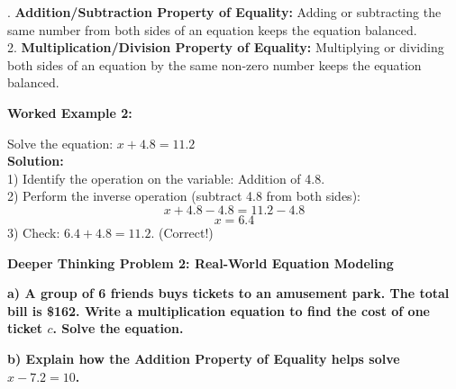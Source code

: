 \documentclass[12pt, letterpaper, fleqn]{article}
\begin{document}
. \textbf{Addition/Subtraction Property of Equality:} Adding or subtracting the same number from both sides of an equation keeps the equation balanced. \\
2. \textbf{Multiplication/Division Property of Equality:} Multiplying or dividing both sides of an equation by the same non-zero number keeps the equation balanced.

\vspace{4mm}

\begin{tcolorbox}[colback=white, colframe=black!25, boxrule=0.6pt, arc=4mm, left=6mm, right=6mm, top=5mm, bottom=5mm]
\textbf{Worked Example 2:}

\medskip
\noindent
Solve the equation: $x + 4.8 = 11.2$\\
\textbf{Solution:} \\
1) Identify the operation on the variable: Addition of 4.8. \\
2) Perform the inverse operation (subtract 4.8 from both sides): \\
$$x + 4.8 - 4.8 = 11.2 - 4.8$$
$$x = 6.4$$
3) Check: $6.4 + 4.8 = 11.2$. (Correct!)
\end{tcolorbox}

\vspace{4mm}

\begin{tcolorbox}[colback=white, colframe=black, boxrule=1pt, arc=4mm, left=6mm, right=6mm, top=5mm, bottom=5mm]
\textbf{Deeper Thinking Problem 2: Real-World Equation Modeling}

\medskip

\noindent
\textbf{a) A group of 6 friends buys tickets to an amusement park. The total bill is \$162. Write a multiplication equation to find the cost of one ticket $c$. Solve the equation.}

\vspace{3cm}

\noindent
\textbf{b) Explain how the Addition Property of Equality helps solve $x - 7.2 = 10$.}

\vspace{3cm}
\end{tcolorbox}
\newpage
\end{document}
